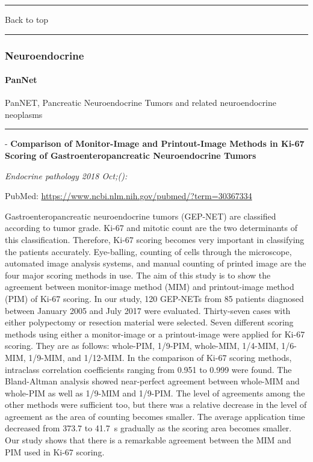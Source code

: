 \documentclass[]{article}
\let\oldparagraph\paragraph
\renewcommand{\paragraph}[1]{\oldparagraph{#1}\mbox{}}
\begin{document}
{}

{}

\begin{center}\rule{0.5\linewidth}{\linethickness}\end{center}

Back to top

\begin{center}\rule{0.5\linewidth}{\linethickness}\end{center}

\pagebreak

\hypertarget{neuroendocrine}{%
\subsubsection{Neuroendocrine}\label{neuroendocrine}}

\hypertarget{pannet}{%
\paragraph{PanNet}\label{pannet}}

PanNET, Pancreatic Neuroendocrine Tumors and related neuroendocrine
neoplasms

\begin{center}\rule{0.5\linewidth}{\linethickness}\end{center}

 - \textbf{Comparison of Monitor-Image and Printout-Image Methods in
Ki-67 Scoring of Gastroenteropancreatic Neuroendocrine Tumors}

\emph{Endocrine pathology 2018 Oct;():}

PubMed: \url{https://www.ncbi.nlm.nih.gov/pubmed/?term=30367334}

Gastroenteropancreatic neuroendocrine tumors (GEP-NET) are classified
according to tumor grade. Ki-67 and mitotic count are the two
determinants of this classification. Therefore, Ki-67 scoring becomes
very important in classifying the patients accurately. Eye-balling,
counting of cells through the microscope, automated image analysis
systems, and manual counting of printed image are the four major scoring
methods in use. The aim of this study is to show the agreement between
monitor-image method (MIM) and printout-image method (PIM) of Ki-67
scoring. In our study, 120 GEP-NETs from 85 patients diagnosed between
January 2005 and July 2017 were evaluated. Thirty-seven cases with
either polypectomy or resection material were selected. Seven different
scoring methods using either a monitor-image or a printout-image were
applied for Ki-67 scoring. They are as follows: whole-PIM, 1/9-PIM,
whole-MIM, 1/4-MIM, 1/6-MIM, 1/9-MIM, and 1/12-MIM. In the comparison of
Ki-67 scoring methods, intraclass correlation coefficients ranging from
0.951 to 0.999 were found. The Bland-Altman analysis showed near-perfect
agreement between whole-MIM and whole-PIM as well as 1/9-MIM and
1/9-PIM. The level of agreements among the other methods were sufficient
too, but there was a relative decrease in the level of agreement as the
area of counting becomes smaller. The average application time decreased
from 373.7 to 41.7~s gradually as the scoring area becomes smaller. Our
study shows that there is a remarkable agreement between the MIM and PIM
used in Ki-67 scoring.
\end{document}
